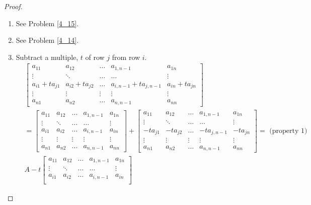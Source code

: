 \documentclass[../main.tex]{subfiles}
\begin{document}
\begin{proof}
\begin{enumerate}[leftmargin=*]
    The proof that \(det(tA) = t det(A)\) is left to Problem \ref{pr:4_13}.
    \item See Problem \ref{4_15}.
    \item See Problem \ref{4_14}.
    \item Subtract a multiple, \(t\) of row \(j\) from row \(i\).
    \begin{equation*}
      \begin{aligned}
        &\begin{bmatrix}
          a_{11} & a_{12} & \hdots & a_{1,n-1} & a_{1n}\\
          \vdots & \ddots & \hdots & \hdots & \vdots\\
          a_{i1} + ta_{j1} & a_{i2} + ta_{j2} & \hdots & a_{i,n-1} + ta_{j, n-1} & a_{in}+ ta_{jn}\\
          \vdots & \vdots & \vdots & \vdots & \vdots\\
          a_{n1} & a_{n2} & \hdots & a_{n,n-1} & a_{nn}
        \end{bmatrix}\\
        &=\begin{bmatrix}
          a_{11} & a_{12} & \hdots & a_{1,n-1} & a_{1n}\\
          \vdots & \ddots & \hdots & \hdots & \vdots\\
          a_{i1} & a_{i2} & \hdots & a_{i,n-1} & a_{in}\\
          \vdots & \vdots & \vdots & \vdots & \vdots\\
          a_{n1} & a_{n2} & \hdots & a_{n,n-1} & a_{nn}
        \end{bmatrix}
        +\begin{bmatrix}
          a_{11} & a_{12} & \hdots & a_{1,n-1} & a_{1n}\\
          \vdots & \ddots & \hdots & \hdots & \vdots\\
          -ta_{j1} & -ta_{j2} & \hdots & -ta_{j,n-1} & -ta_{jn}\\
          \vdots & \vdots & \vdots & \vdots & \vdots\\
          a_{n1} & a_{n2} & \hdots & a_{n,n-1} & a_{nn}
        \end{bmatrix} = \text{ (property 1)}\\
         &A - t\begin{bmatrix}
           a_{11} & a_{12} & \hdots & a_{1,n-1} & a_{1n}\\
           \vdots & \ddots & \hdots & \hdots & \vdots\\
           a_{i1} & a_{i2} & \hdots & a_{i,n-1} & a_{in}\\

\end{bmatrix}
\end{aligned}
\end{equation*}
\end{enumerate}
\end{proof}
\end{document}
